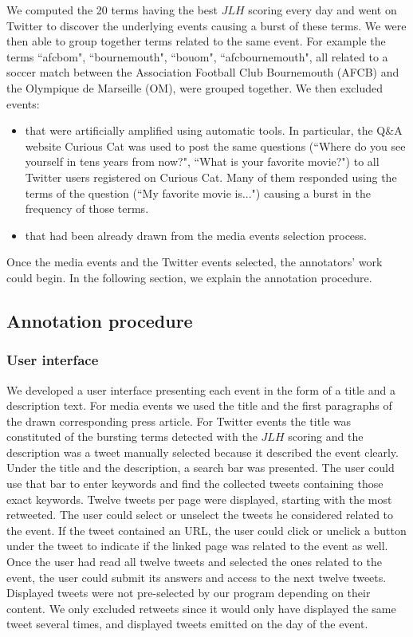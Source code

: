 We computed the 20 terms having the best $JLH$ scoring every day and went on Twitter to discover the underlying events causing a burst of these terms. We were then able to group together terms related to the same event. For example the terms ``afcbom", ``bournemouth", ``bouom", ``afcbournemouth", all related to a soccer match between the Association Football Club Bournemouth (AFCB) and the Olympique de Marseille (OM), were grouped together. We then excluded events:
\begin{itemize}
\item that were artificially amplified using automatic tools. In particular, the Q\&A website Curious Cat was used to post the same questions (``Where do you see yourself in tens years from now?", ``What is your favorite movie?") to all Twitter users registered on Curious Cat. Many of them responded using the terms of the question (``My favorite movie is...") causing a burst in the frequency of those terms.
\item that had been already drawn from the media events selection process.
\end{itemize}

Once the media events and the Twitter events selected, the annotators' work could begin. In the following section, we explain the annotation procedure.
		\subsection{Annotation procedure}
		\subsubsection{User interface}
We developed a user interface presenting each event in the form of a title and a description text. For media events we used the title and the first paragraphs of the drawn corresponding press article. For Twitter events the title was constituted of the bursting terms detected with the $JLH$ scoring and the description was a tweet manually selected because it described the event clearly. Under the title and the description, a search bar was presented. The user could use that bar to enter keywords and find the collected tweets containing those exact keywords. Twelve tweets per page were displayed, starting with the most retweeted. The user could select or unselect the tweets he considered related to the event. If the tweet contained an URL, the user could click or unclick a button under the tweet to indicate if the linked page was related to the event as well. Once the user had read all twelve tweets and selected the ones related to the event, the user could submit its answers and access to the next twelve tweets. Displayed tweets were not pre-selected by our program depending on their content. We only excluded retweets since it would only have displayed the same tweet several times, and displayed tweets emitted on the day of the event. 


